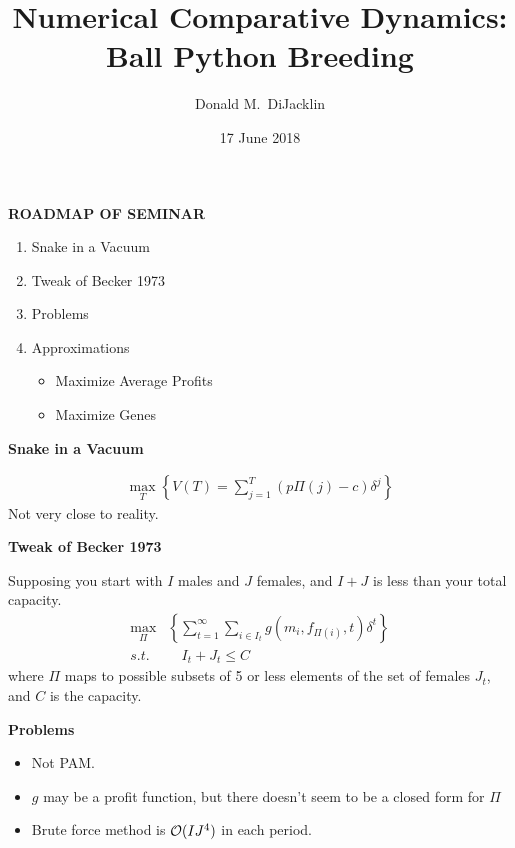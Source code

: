 \documentclass[grey,handout]{beamer}
\renewcommand{\frametitle}[1]{\begin{center}\textbf{#1}\end{center}}
\def\BigO{{\cal O}}
\begin{document}
\title{Numerical Comparative Dynamics: Ball Python Breeding}

\author{Donald M.~DiJacklin}
\date{17 June 2018}

\begin{frame}
  \titlepage
\end{frame}

\begin{frame}
\frametitle{ROADMAP OF SEMINAR}
  \begin{enumerate}[<+->]
    \item Snake in a Vacuum
    \item Tweak of Becker 1973
    \item Problems
    \item Approximations
    \begin{itemize}
      \item Maximize Average Profits
      \item Maximize Genes
    \end{itemize}
  \end{enumerate}
\end{frame}


\begin{frame}
\frametitle{Snake in a Vacuum}
  \begin{align*}
    \max_T\left\{  V(T) = \sum_{j=1}^{T}(p\Pi(j) - c)\delta^j\right\}
  \end{align*}
  Not very close to reality.
  

\end{frame}
\begin{frame}
  \frametitle{Tweak of Becker 1973}
  Supposing you start with $I$ males and $J$ females, and $I+J$  is less than your total capacity.
  \begin{align*}
    \max_\Pi&\left\{ \sum_{t=1}^{\infty}\sum_{i\in I_t}g\left(m_i,f_{\Pi(i)},t\right)\delta^t \right\}\\
    s.t. &\quad I_t+J_t\leq C
  \end{align*}
  where $\Pi$ maps to possible subsets of 5 or less elements of the set of females $J_t$, and $C$ is the capacity.
\end{frame}

\begin{frame}
  \frametitle{Problems}
  \begin{itemize}
    \item Not PAM.
    \item $g$ may be a profit function, but there doesn't seem to be a closed form for $\Pi$
    
    \item Brute force method is $\BigO(IJ^4)$ in each period.
  \end{itemize}
\end{frame}
\end{document}
